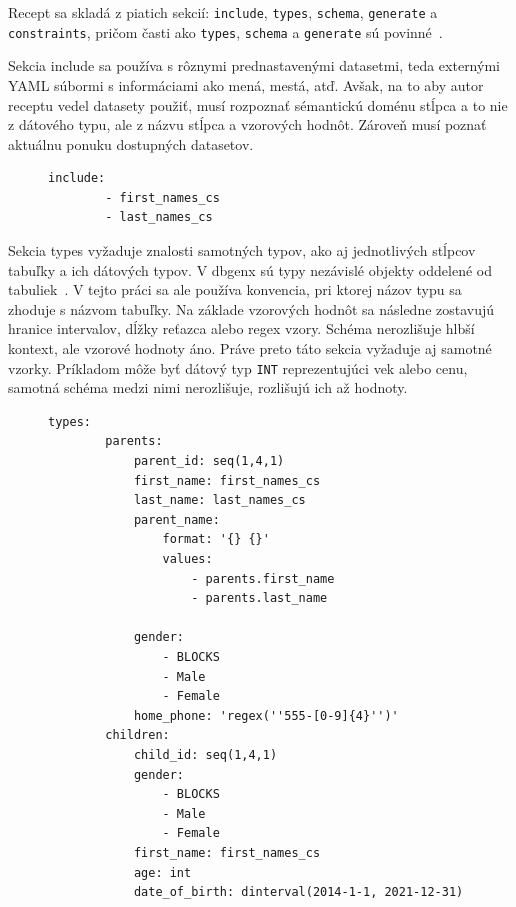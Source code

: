 Recept sa skladá z piatich sekcií: \texttt{include}, \texttt{types}, \texttt{schema}, \texttt{generate} a \texttt{constraints}, pričom časti ako \texttt{types}, \texttt{schema} a \texttt{generate}  sú povinné~\cite{Vlach2020}.


Sekcia include sa používa s rôznymi prednastavenými datasetmi, teda externými YAML súbormi s informáciami ako mená, mestá, atď. Avšak, na to aby autor receptu vedel datasety použiť, musí rozpoznať sémantickú doménu stĺpca a to nie z dátového typu, ale z názvu stĺpca a vzorových hodnôt. Zároveň musí poznať aktuálnu ponuku dostupných datasetov. 

\begin{figure}[H]
    \centering
  \begin{lstlisting}[caption={Include sekcia pre ukážkovú databázu}, label={lst:recipe-include}, frame=single, linewidth=0.65\textwidth, xleftmargin=0.28\textwidth]
    include:
        - first_names_cs
        - last_names_cs
\end{lstlisting}

\end{figure}

Sekcia types vyžaduje znalosti samotných typov, ako aj jednotlivých stĺpcov tabuľky a ich dátových typov. V dbgenx sú typy nezávislé objekty oddelené od tabuliek~\cite{Vlach2020}. V tejto práci sa ale používa konvencia, pri ktorej názov typu sa zhoduje s názvom tabuľky. Na základe vzorových hodnôt sa následne zostavujú hranice intervalov, dĺžky reťazca alebo regex vzory. Schéma nerozlišuje hlbší kontext, ale vzorové hodnoty áno. Práve preto táto sekcia vyžaduje aj samotné vzorky. Príkladom môže byť dátový typ \texttt{INT} reprezentujúci vek alebo cenu, samotná schéma medzi nimi nerozlišuje, rozlišujú ich až hodnoty.



\begin{figure}[H]
    \centering
    \begin{lstlisting}[caption={types sekcia pre ukážkovú databázu.}, frame=single, linewidth=0.9\textwidth, xleftmargin=0.100\textwidth, label={lst:recipe-types}]
    types:
        parents:
            parent_id: seq(1,4,1)
            first_name: first_names_cs
            last_name: last_names_cs
            parent_name:
                format: '{} {}'
                values:
                    - parents.first_name
                    - parents.last_name

            gender:
                - BLOCKS
                - Male
                - Female
            home_phone: 'regex(''555-[0-9]{4}'')'
        children:
            child_id: seq(1,4,1)
            gender:
                - BLOCKS
                - Male
                - Female
            first_name: first_names_cs
            age: int
            date_of_birth: dinterval(2014-1-1, 2021-12-31)
    \end{lstlisting}

\end{figure}

